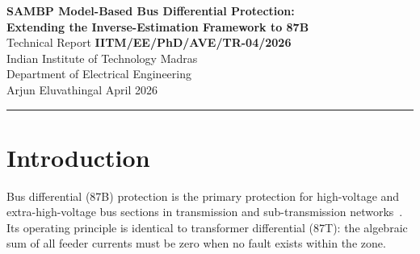 \documentclass[12pt,a4paper]{article}
\newcommand{\kappan}{\kappa_n}
\newcommand{\thetaB}{\boldsymbol{\theta}_B}
\begin{document}

\begin{center}
  {\Large\bfseries
   SAMBP Model-Based Bus Differential Protection:\\[4pt]
   Extending the Inverse-Estimation Framework to 87B}\\[12pt]
  {\large Technical Report \textbf{IITM/EE/PhD/AVE/TR-04/2026}}\\[6pt]
  {\large Indian Institute of Technology Madras\\
   Department of Electrical Engineering}\\[6pt]
  {\normalsize Arjun Eluvathingal \quad\quad April 2026}\\[6pt]
  \rule{\textwidth}{0.8pt}
\end{center}

\begin{abstract}
This report extends the SAMBP (Signal-Adapted Model-Based Protection) framework
to bus differential (87B) protection.  A three-parameter zone model
$\thetaB = [I_{diff}, \varphi, \varepsilon_{CT}]$ is proposed, where the CT
mismatch/saturation factor $\varepsilon_{CT}$ is used to derive an internal-fault
indicator $f_{int} = \text{clip}(1 - \varepsilon_{CT}/\varepsilon_{thresh}, 0, 1)$
that is both identifiable and monotone.  The column-normalised condition number
satisfies $\kappan \leq 6.3$ across all scenarios, the lowest of any SAMBP function
to date.  A two-pass Levenberg-Marquardt estimator and a Stage-2 model-veto gate
are implemented and validated on six canonical events.  Five of six events are
correctly classified with zero assertion failures; CT open-circuit is documented
as an irreducible limitation requiring a high-impedance bus differential scheme.
\end{abstract}

\tableofcontents
\listoffigures
\listoftables

\section{Introduction}
\label{sec:intro}

Bus differential (87B) protection is the primary protection for high-voltage
and extra-high-voltage bus sections in transmission and sub-transmission
networks~\citep{Blackburn2006,IEC60255_87}.  Its operating principle is
identical to transformer differential (87T): the algebraic sum of all feeder
currents must be zero when no fault exists within the zone.
\end{document}
